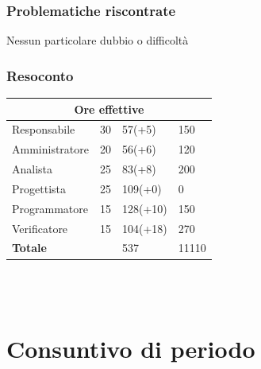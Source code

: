 \documentclass[9pt]{article}
\begin{document}
\subsubsection{Problematiche riscontrate}
Nessun particolare dubbio o difficoltà


\subsubsection{Resoconto}
\begin{center}
	\begin{tabularx}{\textwidth}{|X|X|X|X|}
		\hline														
		\multicolumn{4}{|c|}{\textbf{Ore effettive}}                                      \\														
		\hline														
		Responsabile		&		30		&		57(+5)		&		150		\\
		\hline														
		Amministratore		&		20		&		56(+6)		&		120		\\
		\hline														
		Analista		&		25		&		83(+8)		&		200		\\
		\hline														
		Progettista		&		25		&		109(+0)		&		0		\\
		\hline														
		Programmatore		&		15		&		128(+10)		&		150		\\
		\hline														
		Verificatore		&		15		&		104(+18)		&		270		\\
		\hline														
		\textbf{Totale}		&				&		537		&		11110		\\
		\hline														
																																		
	\end{tabularx}\\[8pt]
	\mbox{}\\
\end{center}


\section{Consuntivo di periodo}
\end{document}
